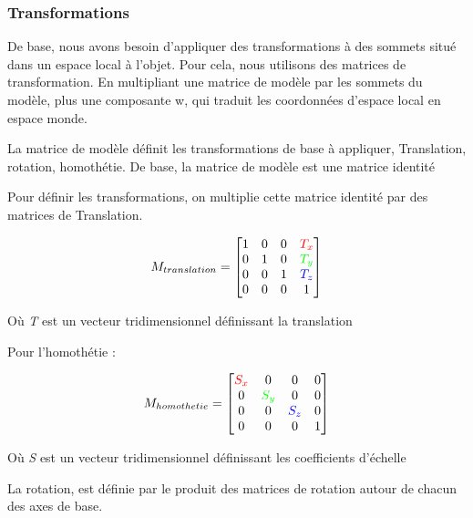 \documentclass[pdftex, 11pt, a4paper, titlepage]{article}
\begin{document}
\subsubsection{Transformations}

De base, nous avons besoin d'appliquer des transformations à des
sommets situé dans un espace local à l'objet.  Pour cela, nous
utilisons des matrices de transformation.  En multipliant une matrice
de modèle par les sommets du modèle, plus une composante w, qui
traduit les coordonnées d'espace local en espace monde.

La matrice de modèle définit les transformations de base à appliquer,
Translation, rotation, homothétie.  De base, la matrice de modèle est
une matrice identité

Pour définir les transformations, on multiplie cette matrice identité
par des matrices de Translation.

\begin{equation*}
M_{translation} =
  \begin{bmatrix}
    1 & 0 & 0 & \color{red}{T_x} \\
    0 & 1 & 0 & \color{green}{T_y} \\
    0 & 0 & 1 & \color{blue}{T_z} \\
    0 & 0 & 0 & 1
  \end{bmatrix}
\end{equation*}

Où \emph{T} est un vecteur tridimensionnel définissant la translation

Pour l'homothétie :

\begin{equation*}
  M_{homothetie} =
  \begin{bmatrix}
    \color{red}{S_x} & 0                  & 0                 & 0 \\
    0                & \color{green}{S_y} & 0                 & 0 \\
    0                & 0                  & \color{blue}{S_z} & 0 \\
    0 & 0 & 0 & 1
  \end{bmatrix}
\end{equation*}

Où \emph{S} est un vecteur tridimensionnel définissant les
coefficients d'échelle

La rotation, est définie par le produit des matrices de rotation
autour de chacun des axes de base.
\end{document}
